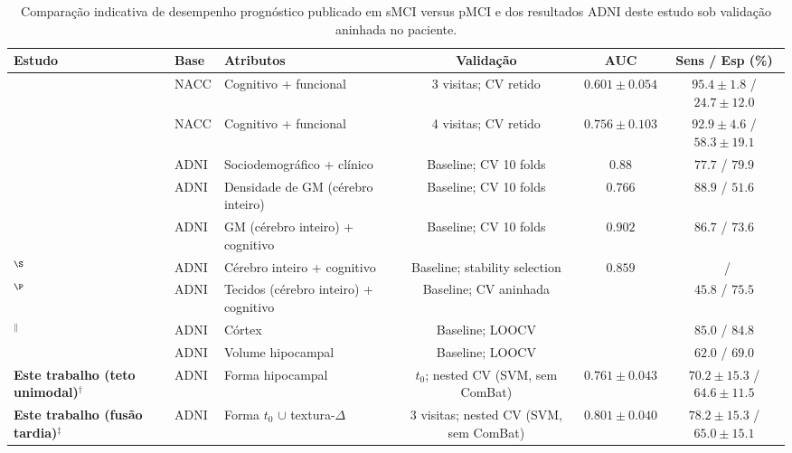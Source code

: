 \documentclass[review]{elsarticle}
\begin{document}
\begin{table}
	\centering
	\footnotesize
	\setlength{\tabcolsep}{4pt}
	\renewcommand{\arraystretch}{1.15}
	\caption{Comparação indicativa de desempenho prognóstico publicado em sMCI versus pMCI e dos resultados ADNI deste estudo sob validação aninhada no paciente.}
	\label{tab:literature_comparison}
	\begin{tabular}{@{}lllccc@{}}
		\toprule
		\textbf{Estudo} & \textbf{Base} & \textbf{Atributos} &
		\textbf{Validação} & \textbf{AUC} & \textbf{Sens / Esp (\%)} \\
		\midrule
		\citet{bucholc-2023} & NACC &
		Cognitivo + funcional &
		3 visitas; CV retido &
		$0.601 \pm 0.054$ & $95.4 \pm 1.8$ / $24.7 \pm 12.0$ \\
		\citet{bucholc-2023} & NACC &
		Cognitivo + funcional &
		4 visitas; CV retido &
		$0.756 \pm 0.103$ & $92.9 \pm 4.6$ / $58.3 \pm 19.1$ \\
		\citet{grassi-2019} & ADNI &
		Sociodemográfico + clínico &
		Baseline; CV 10 folds &
		$0.88$ & $77.7$ / $79.9$ \\
		\citet{moradi-2015} & ADNI &
		Densidade de GM (cérebro inteiro) &
		Baseline; CV 10 folds &
		$0.766$ & $88.9$ / $51.6$ \\
		\citet{moradi-2015} & ADNI &
		GM (cérebro inteiro) + cognitivo &
		Baseline; CV 10 folds &
		$0.902$ & $86.7$ / $73.6$ \\
		\citet{ye-2012}$^{\S}$ & ADNI &
		Cérebro inteiro + cognitivo &
		Baseline; stability selection &
		$0.859$ & \textemdash\ / \textemdash \\
		\citet{casanova-2013}$^{\P}$ & ADNI &
		Tecidos (cérebro inteiro) + cognitivo &
		Baseline; CV aninhada &
		\textemdash & $45.8$ / $75.5$ \\
		\citet{guo-2017a}$^{\|}$ & ADNI &
		Córtex &
		Baseline; LOOCV &
		\textemdash & $85.0$ / $84.8$ \\
		\citet{cuingnet-2011} & ADNI &
		Volume hipocampal &
		Baseline; LOOCV &
		\textemdash & $62.0$ / $69.0$ \\
		\midrule
		\textbf{Este trabalho (teto unimodal)}$^{\dagger}$ & ADNI &
		Forma hipocampal &
		$t_0$; nested CV (SVM, sem ComBat) &
		$\mathbf{0.761 \pm 0.043}$ & $\mathbf{70.2 \pm 15.3}$ / $\mathbf{64.6 \pm 11.5}$ \\
		\textbf{Este trabalho (fusão tardia)}$^{\ddagger}$ & ADNI &
		Forma $t_0$ $\cup$ textura-$\Delta$ &
		3 visitas; nested CV (SVM, sem ComBat) &
		$\mathbf{0.801 \pm 0.040}$ & $\mathbf{78.2 \pm 15.3}$ / $\mathbf{65.0 \pm 15.1}$ \\

\end{tabular}
\end{table}
\end{document}
